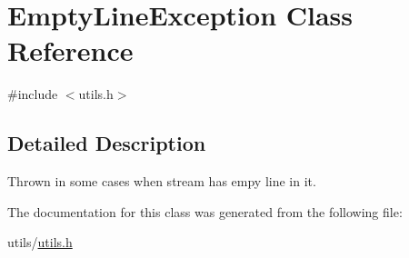 \hypertarget{class_empty_line_exception}{}\section{Empty\+Line\+Exception Class Reference}
\label{class_empty_line_exception}


{\ttfamily \#include $<$utils.\+h$>$}



\subsection{Detailed Description}
Thrown in some cases when stream has empy line in it. 

The documentation for this class was generated from the following file\+:\begin{DoxyCompactItemize}
\item 
utils/\mbox{\hyperlink{utils_8h}{utils.\+h}}\end{DoxyCompactItemize}
